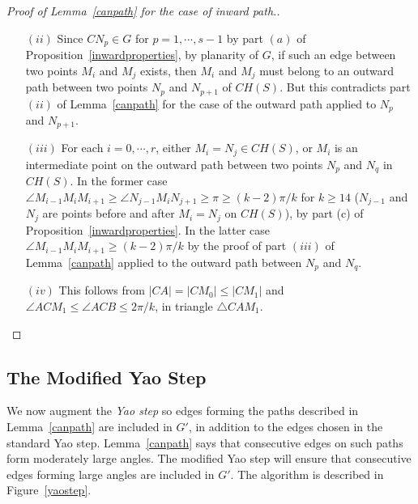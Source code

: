 \documentclass{stacs_proc}
\theoremstyle{plain}\newtheorem{satz}[thm]{Satz}
\begin{document}
\begin{proof}[Proof of Lemma~\ref{canpath} for the case of inward
path.]
\begin{itemize}
\item[$(ii)$] Since $CN_p \in G$ for $p=1, \cdots, s-1$ by part $(a)$ of
Proposition~\ref{inwardproperties}, by planarity of $G$, if such an
edge between two points $M_i$ and $M_j$ exists, then $M_i$ and $M_j$
must belong to an outward path between two points $N_p$ and
$N_{p+1}$ of $CH(S)$. But this contradicts part $(ii)$ of
Lemma~\ref{canpath} for the case of the outward path applied to
$N_p$ and $N_{p+1}$.

\item[$(iii)$] For each $i= 0, \cdots, r$, either $M_i =N_j \in CH(S)$,
or $M_i$ is an intermediate point on the outward path between two
points $N_p$ and $N_q$ in $CH(S)$. In the former case
$\angle{M_{i-1}M_iM_{i+1}} \geq \angle{N_{j-1}M_iN_{j+1}} \geq \pi
\geq (k-2)\pi/k$ for $k\geq 14$ ($N_{j-1}$ and $N_j$ are points
before and after $M_i=N_j$ on $CH(S)$), by part (c) of
Proposition~\ref{inwardproperties}. In the latter case
$\angle{M_{i-1}M_iM_{i+1}} \geq (k-2)\pi/k$ by the proof of part
$(iii)$ of Lemma~\ref{canpath} applied to the outward path between
$N_p$ and $N_q$.

\item[$(iv)$] This follows from $|CA|=|CM_0| \leq |CM_1|$ and
$\angle{ACM_1} \leq \angle{ACB} \leq 2\pi/k$, in triangle
$\triangle{CAM_1}$.
\end{itemize}
\end{proof}

\subsection{The Modified Yao Step}
\label{modifiedyaoalgo}

We now augment the {\em Yao step} so edges forming the paths described in
Lemma~\ref{canpath} are included in $G'$, in addition to the edges chosen
in the standard Yao step. Lemma~\ref{canpath} says that consecutive edges
on such paths form moderately large angles. The modified Yao step will
ensure that consecutive edges forming large angles are included in $G'$.
The algorithm is described in Figure~\ref{yaostep}.
\end{document}
